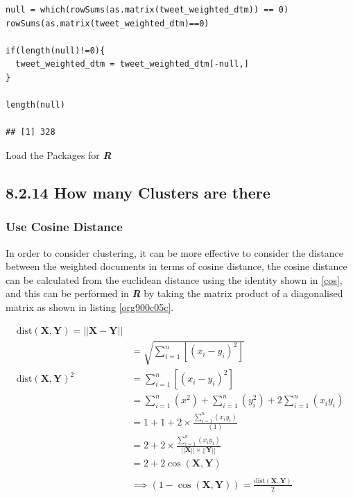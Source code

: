 \documentclass[11pt]{article}
\begin{document}
\begin{listing}[htbp]
\begin{verbatim}
null = which(rowSums(as.matrix(tweet_weighted_dtm)) == 0)
rowSums(as.matrix(tweet_weighted_dtm)==0)

if(length(null)!=0){
  tweet_weighted_dtm = tweet_weighted_dtm[-null,]
}

length(null)

## [1] 328
\end{verbatim}
\caption{\label{orgf5baf82}Load the Packages for \textbf{\textbf{\emph{R}}}}
\end{listing}
\subsection{8.2.14 How many Clusters are there}
\label{sec:orgb1931e7}
\subsubsection{Use Cosine Distance}
\label{sec:orgba0ab10}
In order to consider clustering, it can be more effective to consider the distance between the weighted documents in terms of cosine distance, the cosine distance can be calculated from the euclidean distance using the identity shown in \eqref{cos}, and this can be performed in \textbf{\emph{R}} by taking the matrix product of a diagonalised matrix as shown in listing \ref{org900c05c}.

\begin{align}
\mathrm{dist}\left( \mathbf{X}, \mathbf{Y} \right)= \left| \left| \mathbf{X}-\mathbf{Y} \right| \right| \\
&= \sqrt{\sum^{n}_{i= 1}   \left[ \left( x_i-y_i \right)^2 \right] } \\
\mathrm{dist}\left( \mathbf{X}, \mathbf{Y} \right)^2&= \sum^{n}_{i= 1}  \left[ \left( x_i-y_i \right)^2 \right] \\
&= \sum^{n}_{i= 1}   \left( x^2 \right)+  \sum^{n}_{i= 1}   \left( y_i^2 \right)+ 2 \sum^{n}_{i= 1}   \left( x_iy_i \right) \\
&= 1+ 1 +  2 \times  \frac{\sum^{n}_{i= 1}   \left( x_iy_i \right)}{\left( 1 \right) }\\
&= 2+ 2\times \frac{\sum^{n}_{i= 1}   \left( x_iy_i \right)}{\left| \left| \mathbf{X} \right| \right|\times \left| \left| \mathbf{Y} \right| \right|}\\
&= 2+ 2 \cos\left( \mathbf{X}, \mathbf{Y} \right)\\
\ \\
& \implies  \left( 1- \cos\left( \mathbf{X}, \mathbf{Y} \right) \right) = \frac{\mathrm{dist}\left( \mathbf{X}, \mathbf{Y} \right)}{2} \label{cos}
\end{align}
\end{document}
